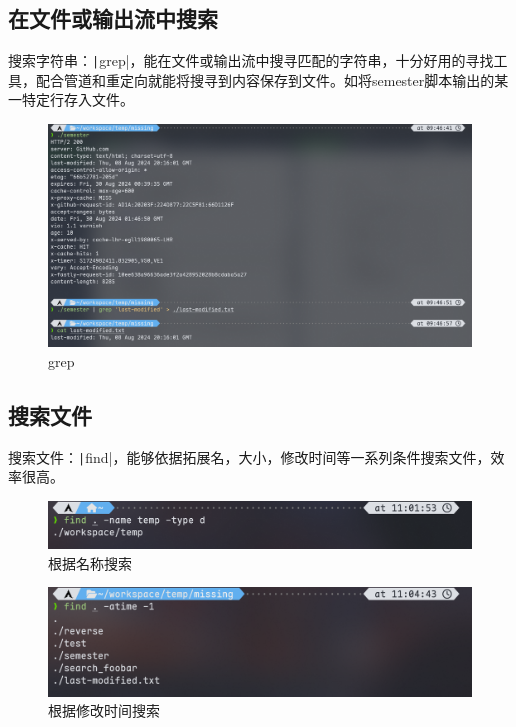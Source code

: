 \documentclass[fontset=ubuntu]{ctexart}
\begin{document}
\begin{sloppypar}
\subsection{在文件或输出流中搜索}
搜索字符串：\texttt|grep|，能在文件或输出流中搜寻匹配的字符串，十分好用的寻找工具，配合管道和重定向就能将搜寻到内容保存到文件。如将semester脚本输出的某一特定行存入文件。
\begin{figure}[htb]
    \centering
    \includegraphics[width=0.75\linewidth]{Grep.png}
    \caption{grep}
    \label{fig:grep}
\end{figure}

\subsection{搜索文件}
搜索文件：\texttt|find|，能够依据拓展名，大小，修改时间等一系列条件搜索文件，效率很高。
\begin{figure}[htb]
    \centering
    \includegraphics[width=0.75\linewidth]{Find_name.png}
    \caption{根据名称搜索}
    \label{fig:find name}
\end{figure}

\begin{figure}[htb]
    \centering
    \includegraphics[width=0.75\linewidth]{Find_time.png}
    \caption{根据修改时间搜索}
    \label{fig:find time}
\end{figure}


\end{sloppypar}
\end{document}
